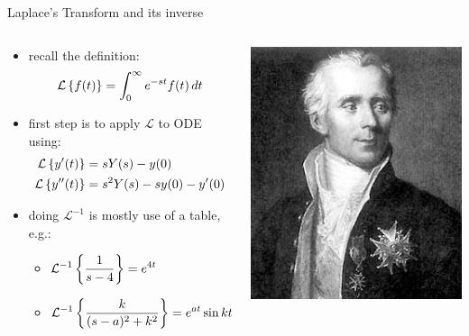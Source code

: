 \documentclass[urlcolor=blue,dvipsnames]{beamer}
\begin{document}
\begin{frame}{Laplace's Transform and its inverse}

\begin{columns}
\begin{column}{0.77\textwidth}
\begin{itemize}
\item recall the definition:
    $$\mathcal{L}\left\{f(t)\right\} = \int_0^\infty e^{-st} f(t)\,dt$$
\item first step is to apply $\mathcal{L}$ to ODE using:
\begin{align*}
\mathcal{L}\left\{y'(t)\right\} &= s Y(s) - y(0) \\
\mathcal{L}\left\{y''(t)\right\} &= s^2 Y(s) - s y(0) - y'(0)
\end{align*}
\item doing $\mathcal{L}^{-1}$ is mostly use of a table, e.g.:
    \begin{itemize}
    \item $\displaystyle \mathcal{L}^{-1}\left\{\frac{1}{s-4}\right\} = e^{4t}$
    \item $\displaystyle \mathcal{L}^{-1}\left\{\frac{k}{(s-a)^2+k^2}\right\} = e^{at} \sin{kt}$
    \end{itemize}
\end{itemize}
\end{column}
\begin{column}{0.23\textwidth}
\includegraphics[width=\textwidth]{figs/Laplace-sharp}


\end{column}
\end{columns}
\end{frame}
\end{document}
